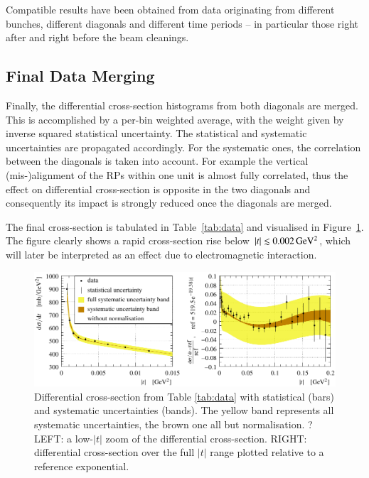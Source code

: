 Compatible results have been obtained from data originating from different bunches, different diagonals and different time periods -- in particular those right after and right before the beam cleanings.



\subsection{Final Data Merging}
\label{sec:final data merging}

Finally, the differential cross-section histograms from both diagonals are merged. This is accomplished by a per-bin weighted average, with the weight given by inverse squared statistical uncertainty. The statistical and systematic uncertainties are propagated accordingly. For the systematic ones, the correlation between the diagonals is taken into account. For example the vertical (mis-)alignment of the RPs within one unit is almost fully correlated, thus the effect on differential cross-section is opposite in the two diagonals and consequently its impact is strongly reduced once the diagonals are merged.

The final cross-section is tabulated in Table~\ref{tab:data} and visualised in Figure~\ref{fig:dsdt}. The figure clearly shows a rapid cross-section rise below $|t| \lesssim 0.002\,{\rm GeV^2}$, which will later be interpreted as an effect due to electromagnetic interaction.



\begin{figure}
\vskip-5mm
\begin{center}
\includegraphics{fig/t_dist_tabulation.pdf}
\vskip-3mm
\caption{%
Differential cross-section from Table \ref{tab:data} with statistical (bars) and systematic uncertainties (bands). The yellow band represents all systematic uncertainties, the brown one all but normalisation. ? LEFT: a low-$|t|$ zoom of the differential cross-section. RIGHT: differential cross-section over the full $|t|$ range plotted relative to a reference exponential.
}
\label{fig:dsdt}
\end{center}
\end{figure}

